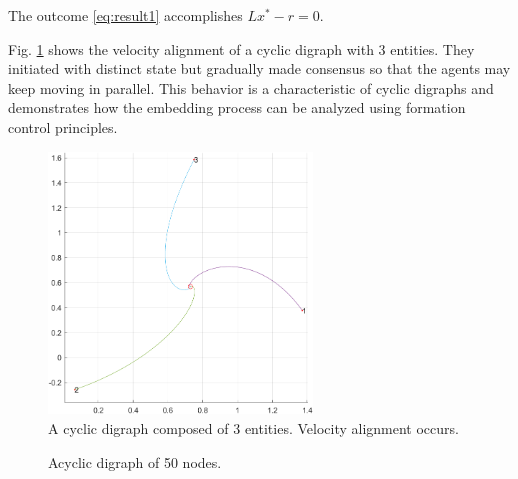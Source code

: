 \documentclass[letterpaper, 10 pt, conference]{ieeeconf}  %
\begin{document}
\noindent The outcome \eqref{eq:result1} accomplishes \(Lx^* - r = 0\). 


Fig. \ref{fig:velo_align} shows the velocity alignment of a cyclic digraph with 3 entities. They initiated with distinct state but gradually made consensus so that the agents may keep moving in parallel. This behavior is a characteristic of cyclic digraphs and demonstrates how the embedding process can be analyzed using formation control principles.



\begin{figure}[thb]
    \begin{center}
    \includegraphics[width=7cm]{IMG/node3_velo_align_4.png}
    \caption{A cyclic digraph composed of 3 entities. Velocity alignment occurs.}
    \label{fig:velo_align}
    \end{center}
    \vspace{-0mm}
\end{figure}

\begin{figure}[h] %
    \centering
    \caption{Acyclic digraph of 50 nodes.}
    \label{fig:50nodes}
\end{figure}
\end{document}
